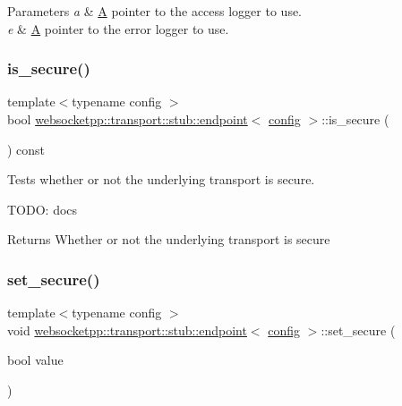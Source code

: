 \begin{DoxyParams}{Parameters}
{\em a} & \mbox{\hyperlink{struct_a}{A}} pointer to the access logger to use. \\
\hline
{\em e} & \mbox{\hyperlink{struct_a}{A}} pointer to the error logger to use. \\
\hline
\end{DoxyParams}
\mbox{\label{classwebsocketpp_1_1transport_1_1stub_1_1endpoint_a57f9ac746c580cacc374b49889e514f7}} 
\subsubsection{\texorpdfstring{is\+\_\+secure()}{is\_secure()}}
{\footnotesize\ttfamily template$<$typename config $>$ \\
bool \mbox{\hyperlink{classwebsocketpp_1_1transport_1_1stub_1_1endpoint}{websocketpp\+::transport\+::stub\+::endpoint}}$<$ \mbox{\hyperlink{classconfig}{config}} $>$\+::is\+\_\+secure (\begin{DoxyParamCaption}{ }\end{DoxyParamCaption}) const\hspace{0.3cm}{\ttfamily [inline]}}



Tests whether or not the underlying transport is secure. 

T\+O\+DO\+: docs

\begin{DoxyReturn}{Returns}
Whether or not the underlying transport is secure 
\end{DoxyReturn}
\mbox{\label{classwebsocketpp_1_1transport_1_1stub_1_1endpoint_a5e7ffca4157517d74c6f433e016f05e8}} 
\subsubsection{\texorpdfstring{set\+\_\+secure()}{set\_secure()}}
{\footnotesize\ttfamily template$<$typename config $>$ \\
void \mbox{\hyperlink{classwebsocketpp_1_1transport_1_1stub_1_1endpoint}{websocketpp\+::transport\+::stub\+::endpoint}}$<$ \mbox{\hyperlink{classconfig}{config}} $>$\+::set\+\_\+secure (\begin{DoxyParamCaption}\item[{bool}]{value }\end{DoxyParamCaption})\hspace{0.3cm}{\ttfamily [inline]}}



